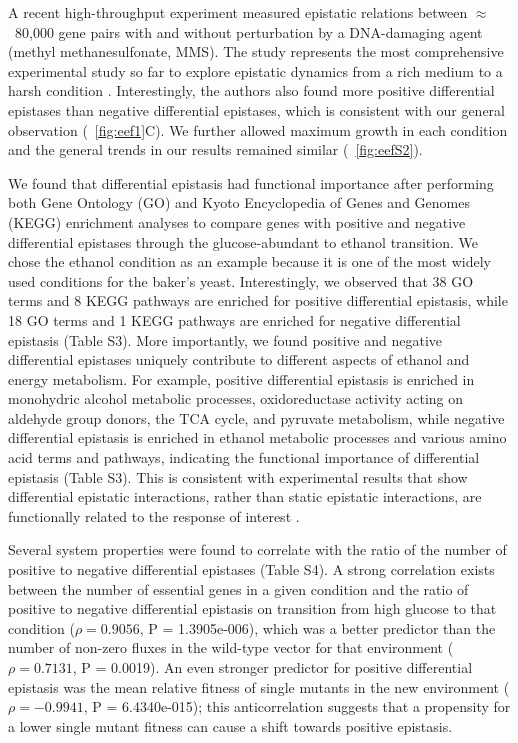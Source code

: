 A recent high-throughput experiment measured epistatic relations
between $\approx$~80,000 gene pairs with and without perturbation by a
DNA-damaging agent (methyl methanesulfonate, MMS). The study
represents the most comprehensive experimental study so far to explore
epistatic dynamics from a rich medium to a harsh condition
\citep{Bandyopadhyay2011}. Interestingly, the authors also found more
positive differential
epistases than negative differential epistases, which is consistent
with our general observation (\Fig~\ref{fig:eef1}C). We further allowed maximum
growth in each condition and the general trends in our results
remained similar (\Fig~\ref{fig:eefS2}).

We found that differential epistasis had functional importance after
performing both Gene Ontology (GO) and Kyoto Encyclopedia of Genes and
Genomes (KEGG) enrichment analyses to compare genes with positive and
negative differential epistases through the glucose-abundant to
ethanol transition. We chose the ethanol condition as an example
because it is one of the most widely used conditions for the baker’s
yeast. Interestingly, we observed that 38 GO terms and 8 KEGG pathways
are enriched for positive differential epistasis, while 18 GO terms
and 1 KEGG pathways are enriched for negative differential epistasis
(Table S3). More importantly, we found positive and negative
differential epistases uniquely contribute to different aspects of
ethanol and energy metabolism. For example, positive differential
epistasis is enriched in monohydric alcohol metabolic processes,
oxidoreductase activity acting on aldehyde group donors, the TCA
cycle, and pyruvate metabolism, while negative differential epistasis
is enriched in ethanol metabolic processes and various amino acid
terms and pathways, indicating the functional importance of
differential epistasis (Table S3). This is consistent with
experimental results that show differential epistatic interactions,
rather than static epistatic interactions, are functionally related to
the response of interest \citep{Bandyopadhyay2011}.

Several system properties were found to correlate with the ratio of
the number of positive to negative differential epistases (Table
S4). A strong correlation exists between the number of essential genes
in a given condition and the ratio of positive to negative
differential epistasis on transition from high glucose to that
condition ($\rho = 0.9056$, P = 1.3905e-006), which was a better predictor
than the number of non-zero fluxes in the wild-type vector for that
environment ($\rho = 0.7131$, P = 0.0019). An even stronger predictor for
positive differential epistasis was the mean relative fitness of
single mutants in the new environment ($\rho = -0.9941$, P = 6.4340e-015);
this anticorrelation suggests that a propensity for a lower single
mutant fitness can cause a shift towards positive epistasis.

